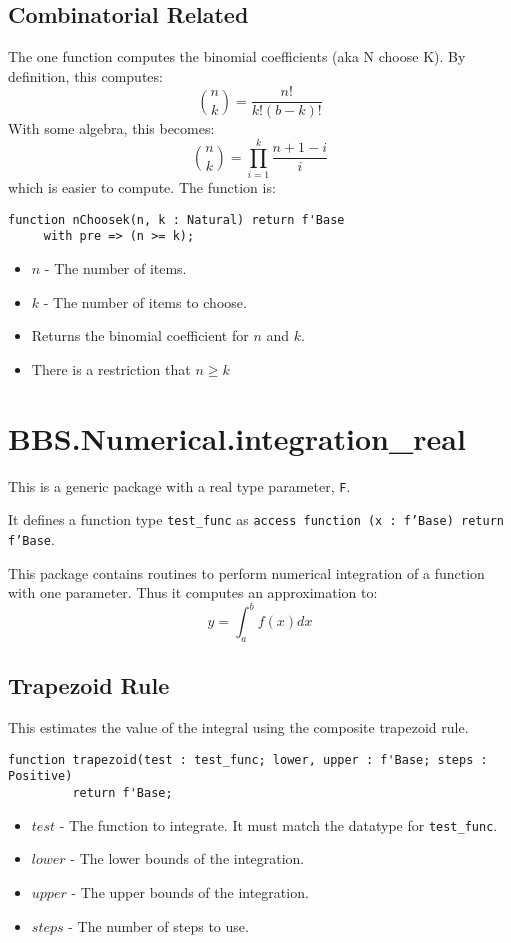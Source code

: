 \documentclass[10pt, openany]{book}
\newcommand{\datatype}[1]{\texttt{#1}}
\begin{document}
\subsection{Combinatorial Related}
The one function computes the binomial coefficients (aka N choose K).  By definition, this computes:
\begin{displaymath}
  \binom{n}{k} = \frac{n!}{k!(b-k)!}
\end{displaymath}
With some algebra, this becomes:
\begin{displaymath}
  \binom{n}{k} = \prod^k_{i=1}\frac{n+1-i}{i}
\end{displaymath}
 which is easier to compute.  The function is:
\begin{lstlisting}
function nChoosek(n, k : Natural) return f'Base
     with pre => (n >= k);
\end{lstlisting}
\begin{itemize}
  \item $n$ - The number of items.
  \item $k$ - The number of items to choose.
  \item Returns the binomial coefficient for $n$ and $k$.
  \item There is a restriction that $n\geq{}k$
\end{itemize}

\section{BBS.Numerical.integration\_real}
This is a generic package with a real type parameter, \datatype{F}.

It defines a function type \datatype{test\_func} as \datatype{access function (x : f'Base) return f'Base}.

This package contains routines to perform numerical integration of a function with one parameter.  Thus it computes an approximation to:
\begin{displaymath}
  y = \int_a^b f(x) dx
\end{displaymath}

\subsection{Trapezoid Rule}
This estimates the value of the integral using the composite trapezoid rule.
\begin{lstlisting}
function trapezoid(test : test_func; lower, upper : f'Base; steps : Positive)
         return f'Base;
\end{lstlisting}
\begin{itemize}
  \item $test$ - The function to integrate.  It must match the datatype for \datatype{test\_func}.
  \item $lower$ - The lower bounds of the integration.
  \item $upper$ - The upper bounds of the integration.
  \item $steps$ - The number of steps to use.
\end{itemize}
\end{document}
